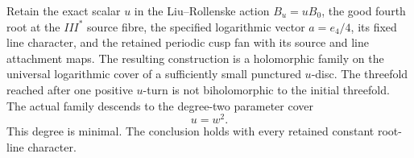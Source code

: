 
\begin{theorem}\hypertarget{tag-01RO}{}\label{ii:LR:covering}

Retain the exact scalar $u$ in the Liu--Rollenske action $B_u=uB_0$,
the good fourth root at the $III^*$ source fibre, the specified
logarithmic vector $a=e_4/4$, its fixed line character, and
the retained periodic cusp fan with its source and line attachment maps.
The resulting construction is a holomorphic family on the universal
logarithmic cover of a sufficiently small punctured $u$-disc.
The threefold reached after one positive $u$-turn is not
biholomorphic to the initial threefold. The actual family descends
to the degree-two parameter cover
\[
                         u=w^2.\tag{LR.1}
\]
This degree is minimal. The conclusion holds with every retained
constant root-line character.
\end{theorem}

